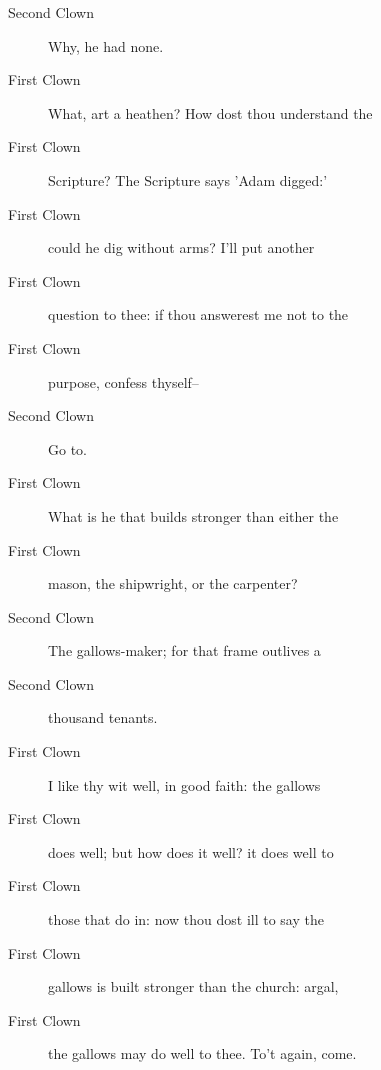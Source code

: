 \documentclass{article}
\begin{document}
\begin{description}
            
\item[Second Clown] Why, he had none.
\end{description}
          
\begin{description}
            
\item[First Clown] What, art a heathen? How dost thou understand the
\item[First Clown] Scripture? The Scripture says 'Adam digged:'
\item[First Clown] could he dig without arms? I'll put another
\item[First Clown] question to thee: if thou answerest me not to the
\item[First Clown] purpose, confess thyself--
\end{description}
          
\begin{description}
            
\item[Second Clown] Go to.
\end{description}
          
\begin{description}
            
\item[First Clown] What is he that builds stronger than either the
\item[First Clown] mason, the shipwright, or the carpenter?
\end{description}
          
\begin{description}
            
\item[Second Clown] The gallows-maker; for that frame outlives a
\item[Second Clown] thousand tenants.
\end{description}
          
\begin{description}
            
\item[First Clown] I like thy wit well, in good faith: the gallows
\item[First Clown] does well; but how does it well? it does well to
\item[First Clown] those that do in: now thou dost ill to say the
\item[First Clown] gallows is built stronger than the church: argal,
\item[First Clown] the gallows may do well to thee. To't again, come.
\end{description}
          
\end{document}
